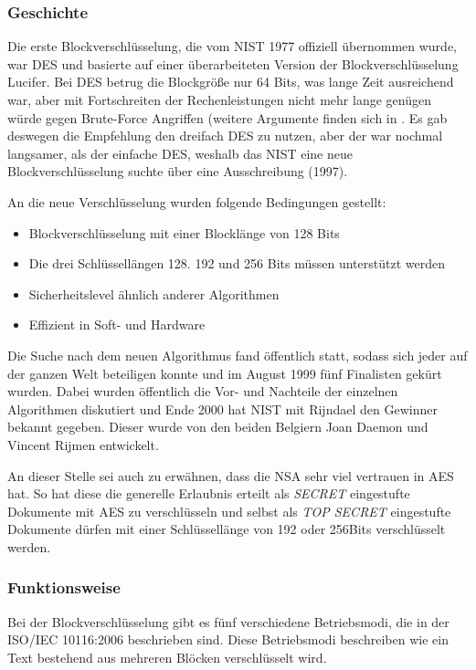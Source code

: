  \subsubsection{Geschichte}
 \label{aes-geschichte}
 Die erste Blockverschlüsselung, die vom \ac{NIST} 1977 offiziell übernommen wurde, war
 \ac{DES} und basierte auf einer überarbeiteten Version der Blockverschlüsselung Lucifer. Bei
 DES betrug die Blockgröße nur 64 Bits, was lange Zeit ausreichend war, aber mit Fortschreiten
 der Rechenleistungen nicht mehr lange genügen würde gegen Brute-Force Angriffen (weitere
 Argumente finden sich in \cite{paar10}. Es gab deswegen die Empfehlung den dreifach DES zu
 nutzen, aber der war nochmal langsamer, als der einfache DES, weshalb das NIST eine neue
 Blockverschlüsselung suchte über eine Ausschreibung (1997).
 
 An die neue Verschlüsselung wurden folgende Bedingungen gestellt:
\begin{itemize}
 \item Blockverschlüsselung mit einer Blocklänge von 128 Bits
 \item Die drei Schlüssellängen 128. 192 und 256 Bits müssen unterstützt werden
 \item Sicherheitslevel ähnlich anderer Algorithmen
 \item Effizient in Soft- und Hardware
\end{itemize} 

Die Suche nach dem neuen Algorithmus fand öffentlich statt, sodass sich jeder auf der ganzen
Welt beteiligen konnte und im August 1999 fünf Finalisten gekürt wurden. Dabei wurden
öffentlich die Vor- und Nachteile der einzelnen Algorithmen diskutiert und Ende 2000 hat NIST
mit Rijndael den Gewinner bekannt gegeben. Dieser wurde von den beiden Belgiern Joan
Daemon und Vincent Rijmen entwickelt.

An dieser Stelle sei auch zu erwähnen, dass die \ac{NSA} sehr viel vertrauen in AES hat. So hat
diese die generelle Erlaubnis erteilt als \emph{SECRET} eingestufte Dokumente mit AES zu
verschlüsseln und selbst als \emph{TOP SECRET} eingestufte Dokumente dürfen mit einer
Schlüssellänge von 192 oder 256Bits verschlüsselt werden. \cite{paar10}
 
 \subsubsection{Funktionsweise}
 \label{aes-funktion}
 Bei der Blockverschlüsselung gibt es fünf verschiedene Betriebsmodi, die in der ISO/IEC 10116:2006
 \cite{ISO10116} beschrieben sind. Diese Betriebsmodi beschreiben wie ein Text bestehend aus
 mehreren Blöcken verschlüsselt wird.
 
